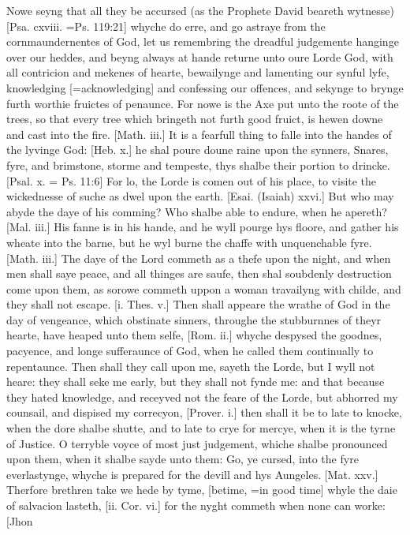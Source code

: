 Nowe seyng that all they be accursed (as the Prophete David beareth wytnesse)
[Psa. cxviii. =Ps.
119:21] whyche do erre, and go astraye from the cornmaundernentes
of God, let us remembring the dreadful judgemente hanginge over our heddes,
and beyng always at hande returne unto oure Lorde God, with all contricion
and mekenes of hearte, bewailynge and lamenting our synful lyfe, knowledging
[=acknowledging]
and confessing our offences, and sekynge to brynge furth worthie fruictes
of penaunce. For nowe is the Axe put unto the roote of the trees, so that
every tree which bringeth not furth good fruict, is hewen downe and cast
into the fire. [Math. iii.] It is a fearfull thing
to falle into the handes of the lyvinge God: [Heb. x.]
he shal poure doune raine upon the synners, Snares, fyre, and brimstone,
storme and tempeste, thys shalbe their portion to drincke.[Psal.
x. = Ps. 11:6]
For lo, the Lorde is comen out of his place, to visite the wickednesse
of suche as dwel upon the earth. [Esai.
(Isaiah) xxvi.] But who may abyde the daye of his comming?
Who shalbe able to endure, when he apereth? [Mal. iii.]
His fanne is in his hande, and he wyll pourge hys floore, and gather his
wheate into the barne, but he wyl burne the chaffe with unquenchable fyre.
[Math. iii.] The daye of the Lord commeth as a
thefe upon the night, and when men shall saye peace, and all thinges are
saufe, then shal soubdenly destruction come upon them, as sorowe commeth
uppon a woman travailyng with childe, and they shall not escape. [i.
Thes. v.] Then shall appeare the wrathe of God in the day of vengeance,
which obstinate sinners, throughe the stubburnnes of theyr hearte, have
heaped unto them selfe, [Rom. ii.] whyche despysed
the goodnes, pacyence, and longe sufferaunce of God, when he called them
continually to repentaunce. Then shall they call upon me, sayeth the Lorde,
but I wyll not heare: they shall seke me early, but they shall not fynde
me: and that because they hated knowledge, and receyved not the feare
of the Lorde, but abhorred my counsail, and dispised my correcyon, [Prover.
i.] then shall it be to late to knocke, when the dore shalbe shutte,
and to late to crye for mercye, when it is the tyrne of Justice. O terryble
voyce of most just judgement, whiche shalbe pronounced upon them,
when it shalbe sayde unto them: Go, ye cursed, into the fyre everlastynge,
whyche is prepared for the devill and hys Aungeles. [Mat.
xxv.] Therfore brethren take we hede by tyme, [betime,
=in good time] whyle the daie of salvacion lasteth, [ii.
Cor. vi.] for the nyght commeth when none can worke: [Jhon
